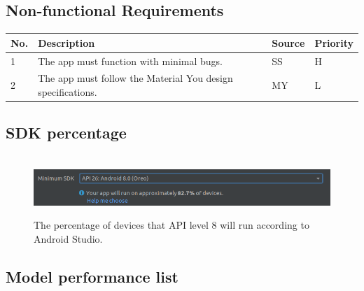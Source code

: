 \documentclass{article}
\begin{document}
\subsection{Non-functional Requirements}
\label{subsec:nonreq}

\begin{table}[h!]
    \begin{tabular}{ |m{1cm}|m{5cm}|m{1.5cm}|m{1.5cm}| }
        \hline
        No. & Description & Source & Priority \\
        \hline
        1 & 
        The app must function with minimal bugs. 
        & SS & H \\
        \hline
        2 & 
        The app must follow the Material You design specifications.
        & MY & L \\
        \hline
    \end{tabular}
    \label{table:nonfunc}
\end{table}

\subsection{SDK percentage}

\label{subsec:sdk}

\begin{figure}[h]\
    \centering
    \includegraphics[width=\textwidth]{Min_SDK.png}
    \caption{The percentage of devices that API level 8 will run according to Android Studio.}
    \label{fig:sdk}
\end{figure}

\clearpage

\subsection{Model performance list}

\label{subsec:models}
\end{document}
